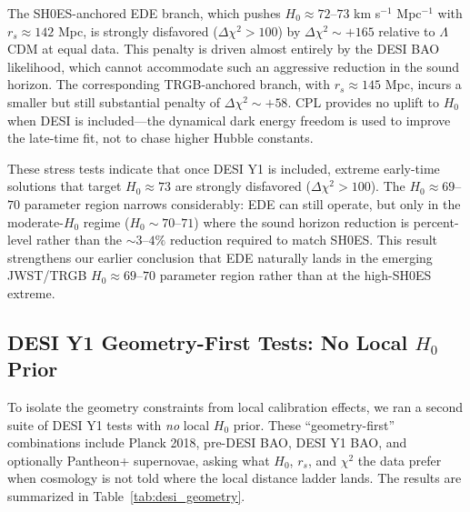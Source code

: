 \documentclass[a4paper,11pt]{article}
\begin{document}
The SH0ES-anchored EDE branch, which pushes $H_0 \approx 72$--$73$ km s$^{-1}$ Mpc$^{-1}$ with $r_s \approx 142$ Mpc, is strongly disfavored ($\Delta\chi^2 > 100$) by $\Delta\chi^2 \sim +165$ relative to $\Lambda$CDM at equal data. This penalty is driven almost entirely by the DESI BAO likelihood, which cannot accommodate such an aggressive reduction in the sound horizon. The corresponding TRGB-anchored branch, with $r_s \approx 145$ Mpc, incurs a smaller but still substantial penalty of $\Delta\chi^2 \sim +58$. CPL provides no uplift to $H_0$ when DESI is included---the dynamical dark energy freedom is used to improve the late-time fit, not to chase higher Hubble constants.

These stress tests indicate that once DESI Y1 is included, extreme early-time solutions that target $H_0 \approx 73$ are strongly disfavored ($\Delta\chi^2 > 100$). The $H_0 \approx 69$--$70$ parameter region narrows considerably: EDE can still operate, but only in the moderate-$H_0$ regime ($H_0 \sim 70$--$71$) where the sound horizon reduction is percent-level rather than the $\sim 3$--$4\%$ reduction required to match SH0ES. This result strengthens our earlier conclusion that EDE naturally lands in the emerging JWST/TRGB $H_0 \approx 69$--$70$ parameter region rather than at the high-SH0ES extreme.

\subsection*{DESI Y1 Geometry-First Tests: No Local $H_0$ Prior}

To isolate the geometry constraints from local calibration effects, we ran a second suite of DESI Y1 tests with \emph{no} local $H_0$ prior. These ``geometry-first'' combinations include Planck 2018, pre-DESI BAO, DESI Y1 BAO, and optionally Pantheon+ supernovae, asking what $H_0$, $r_s$, and $\chi^2$ the data prefer when cosmology is not told where the local distance ladder lands. The results are summarized in Table~\ref{tab:desi_geometry}.
\end{document}
